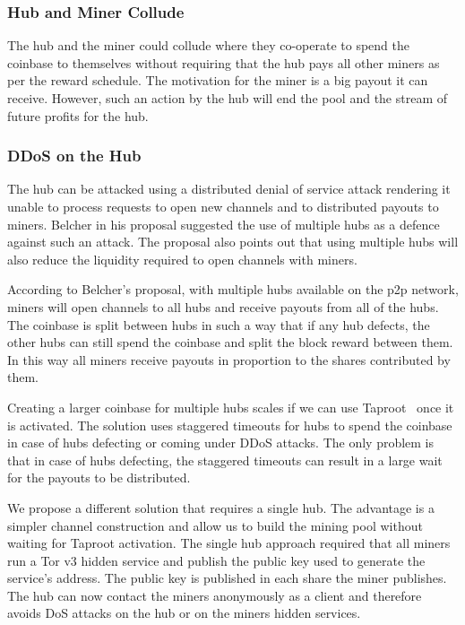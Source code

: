 \documentclass{article}
\begin{document}
\subsubsection{Hub and Miner Collude}\label{ref:collusion}

The hub and the miner could collude where they co-operate to spend the
coinbase to themselves without requiring that the hub pays all other
miners as per the reward schedule. The motivation for the miner is a
big payout it can receive. However, such an action by the hub will
end the pool and the stream of future profits for the hub.


\subsubsection{DDoS on the Hub}\label{ref:ddos-attack}

The hub can be attacked using a distributed denial of service attack
rendering it unable to process requests to open new channels and to
distributed payouts to miners. Belcher in his proposal suggested the
use of multiple hubs as a defence against such an attack. The proposal
also points out that using multiple hubs will also reduce the
liquidity required to open channels with miners.

According to Belcher's proposal, with multiple hubs available on the
p2p network, miners will open channels to all hubs and receive payouts
from all of the hubs. The coinbase is split between hubs in such a way
that if any hub defects, the other hubs can still spend the coinbase
and split the block reward between them. In this way all miners
receive payouts in proportion to the shares contributed by them.

Creating a larger coinbase for multiple hubs scales if we can use
Taproot~\cite{bip340,bip341, bip342} once it is activated. The
solution uses staggered timeouts for hubs to spend the coinbase in
case of hubs defecting or coming under DDoS attacks. The only problem
is that in case of hubs defecting, the staggered timeouts can result
in a large wait for the payouts to be distributed.

We propose a different solution that requires a single hub. The
advantage is a simpler channel construction and allow us to build the
mining pool without waiting for Taproot activation. The single hub
approach required that all miners run a Tor v3 hidden service and
publish the public key used to generate the service's address. The
public key is published in each share the miner publishes. The hub can
now contact the miners anonymously as a client and therefore avoids
DoS attacks on the hub or on the miners hidden services.
\end{document}
